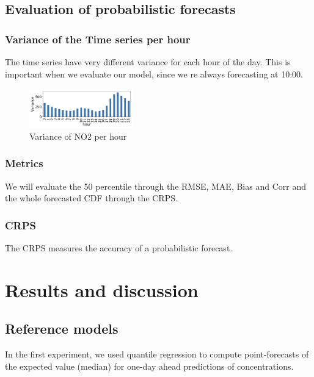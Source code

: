 \documentclass[a4paper,twocolumn,5p]{elsarticle}
\begin{document}
\subsection{Evaluation of probabilistic forecasts}

\subsubsection{Variance of the Time series per hour}

The time series have very different variance for each hour of the day. This is important when we evaluate our model, since
we re always forecasting at 10:00.

\begin{figure}
  \caption{Variance of NO2 per hour}
  \centering
      \includegraphics[width=0.4\textwidth]{variance}
\end{figure}

\subsubsection{Metrics}

We will evaluate the 50 percentile through the RMSE, MAE, Bias and Corr and the whole forecasted CDF through the CRPS.

\subsubsection{CRPS}
\label{sec:eval-extr-value}

The CRPS measures the accuracy of a probabilistic forecast. 

\section{Results and discussion}
\label{sec:results}

\subsection{Reference models}
\label{sec:deterministic}

In the first experiment, we used quantile regression to compute
point-forecasts of the expected value (median) for one-day ahead
predictions of \no concentrations.
\end{document}
